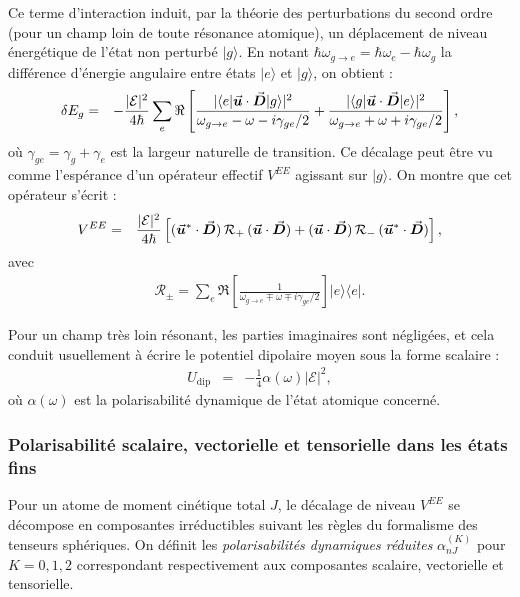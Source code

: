 Ce terme d’interaction induit, par la théorie des perturbations du second ordre (pour un champ loin de toute résonance atomique), un déplacement de niveau énergétique de l’état non perturbé $|g\rangle$. En notant $\hbar \omega_{\scriptstyle g \rightarrow e} = \hbar \omega_e - \hbar\omega_g$ la différence d’énergie angulaire entre états $|e\rangle$ et $|g\rangle$, on obtient :
\begin{eqnarray}\label{chap:dipolaire:eq:nrj2.1}
	\delta E_g  & = &  -\frac{|\mathcal{E}|^2}{4\hbar} \sum_e \Re\left[
		\frac{|\langle e|\vec{{\bm{u}}}\cdot \vec{{\bm{D}}}|g\rangle|^2}{\omega_{\scriptstyle g \rightarrow e}-\omega - i\gamma_{\scriptstyle g  e}/2}
			+
		\frac{|\langle g|\vec{{\bm{u}}}\cdot \vec{{\bm{D}}}|e\rangle|^2}{\omega_{\scriptstyle g \rightarrow e}+\omega + i\gamma_{\scriptstyle g  e}/2}
		\right],
\end{eqnarray}
où $\gamma_{\scriptstyle g  e} = \gamma_g + \gamma_e$ est la largeur naturelle de transition. Ce décalage peut être vu comme l’espérance d’un opérateur effectif $V^{EE}$ agissant sur $|g\rangle$. On montre que cet opérateur s’écrit :
\begin{eqnarray*}
	V^{EE} & = & \frac{|\mathcal{E}|^2}{4\hbar}\left[
		(\vec{{\bm{u}}}^*\cdot \vec{{\bm{D}}})\,\mathcal{R}_+\,(\vec{{\bm{u}}}\cdot \vec{{\bm{D}}}) + (\vec{{\bm{u}}}\cdot \vec{{\bm{D}}})\,\mathcal{R}_-\,(\vec{{\bm{u}}}^*\cdot \vec{{\bm{D}}})
		\right],
\end{eqnarray*}
avec
\begin{eqnarray*}
	\mathcal{R}_\pm = \sum_e \Re\left[\frac{1}{\omega_{\scriptstyle g \rightarrow e} \mp \omega \mp i\gamma_{\scriptstyle g  e}/2} \right] |e\rangle\langle e|.
\end{eqnarray*}

Pour un champ très loin résonant, les parties imaginaires sont négligées, et cela conduit usuellement à écrire le potentiel dipolaire moyen sous la forme scalaire :
\begin{eqnarray*}
	U_{\mathrm{dip}} &=& -\frac{1}{4}\alpha(\omega)\vert\mathcal{E}\vert^2,
\end{eqnarray*}
où $\alpha(\omega)$ est la polarisabilité dynamique de l’état atomique concerné.

\subsubsection{Polarisabilité scalaire, vectorielle et tensorielle dans les états fins}

Pour un atome de moment cinétique total $J$, le décalage de niveau $V^{EE}$ se décompose en composantes irréductibles suivant les règles du formalisme des tenseurs sphériques. On définit les \emph{polarisabilités dynamiques réduites} $\alpha^{(K)}_{nJ}$ pour $K=0,1,2$ correspondant respectivement aux composantes scalaire, vectorielle et tensorielle.

